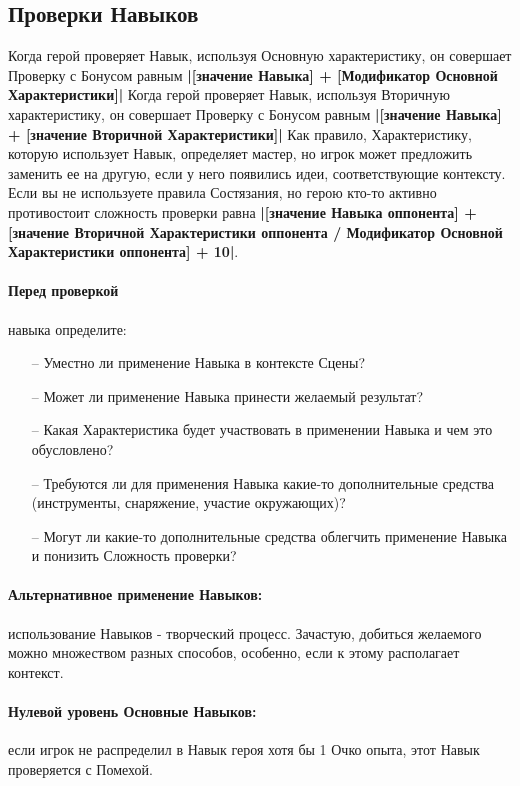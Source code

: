 \subsection{Проверки Навыков}
Когда герой проверяет Навык, используя Основную характеристику, он совершает Проверку с Бонусом равным \textbf{|[значение Навыка] + [Модификатор Основной Характеристики]|}
\newline Когда герой проверяет Навык, используя Вторичную характеристику, он совершает Проверку с Бонусом равным \textbf{|[значение Навыка] + [значение Вторичной Характеристики]|}
\newline Как правило, Характеристику, которую использует Навык, определяет мастер, но игрок может предложить заменить ее на другую, если у него появились идеи, соответствующие контексту.
\newline Если вы не используете правила Состязания, но герою кто-то активно противостоит сложность проверки равна \textbf{|[значение Навыка оппонента] + [значение Вторичной Характеристики оппонента / Модификатор Основной Характеристики оппонента] + 10|}.

\paragraph{Перед проверкой} навыка определите:
\begin{itemize}
    \item[--] Уместно ли применение Навыка в контексте Сцены?
    \item[--] Может ли применение Навыка принести желаемый результат?
    \item[--] Какая Характеристика будет участвовать в применении Навыка и чем это обусловлено?
    \item[--] Требуются ли для применения Навыка какие-то дополнительные средства (инструменты, снаряжение, участие окружающих)?
    \item[--] Могут ли какие-то дополнительные средства облегчить применение Навыка и понизить Сложность проверки?
\end{itemize}

\paragraph{Альтернативное применение Навыков:} использование Навыков - творческий процесс. Зачастую, добиться желаемого можно множеством разных способов, особенно, если к этому располагает контекст. 

\paragraph{Нулевой уровень Основные Навыков:} если игрок не распределил в Навык героя хотя бы 1 Очко опыта, этот Навык проверяется с Помехой.
